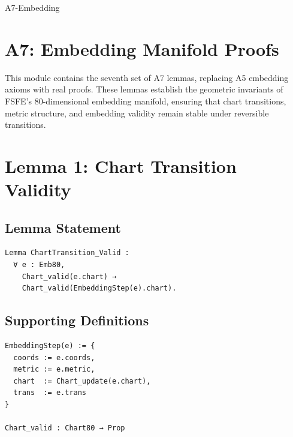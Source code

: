 \documentclass[11pt]{article}
\begin{document}


\begin{citationmembrane}{A7-Embedding}
\end{citationmembrane}

\section*{A7: Embedding Manifold Proofs}

This module contains the seventh set of A7 lemmas, replacing A5 embedding axioms
with real proofs. These lemmas establish the geometric invariants of FSFE’s
80-dimensional embedding manifold, ensuring that chart transitions, metric
structure, and embedding validity remain stable under reversible transitions.

\newpage


\section{Lemma 1: Chart Transition Validity}

\subsection{Lemma Statement}

\begin{verbatim}
Lemma ChartTransition_Valid :
  ∀ e : Emb80,
    Chart_valid(e.chart) →
    Chart_valid(EmbeddingStep(e).chart).
\end{verbatim}

\subsection{Supporting Definitions}

\begin{verbatim}
EmbeddingStep(e) := {
  coords := e.coords,
  metric := e.metric,
  chart  := Chart_update(e.chart),
  trans  := e.trans
}

Chart_valid : Chart80 → Prop
\end{verbatim}
\end{document}
